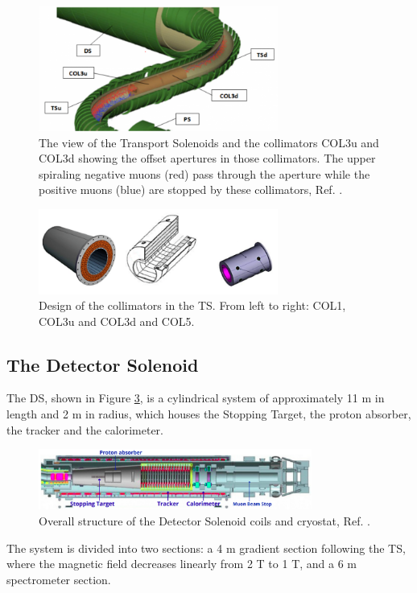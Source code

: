 \begin{figure}[!h]
    \centering
    \includegraphics[width =0.7\textwidth]{figures/png/800px-MuonBeamlineCollimators2.png}
    \caption{The view of the Transport Solenoids and the collimators COL3u and 
    COL3d showing the offset apertures in those collimators. The 
    upper spiraling negative muons (red) pass through the aperture while 
    the positive muons (blue) are stopped by these collimators, Ref. \cite{tsview}.}
    \label{fig:collimators}
    \end{figure}
    \begin{figure}[!h]
        \centering
        \includegraphics[width =0.7\textwidth]{figures/png/Screenshot_20240706_120535.png}
        \caption{Design of the collimators in the TS. From left to right: COL1, COL3u and COL3d
        and COL5.}
        \label{fig:collimatorsshape}
        \end{figure}

\subsection{The Detector Solenoid}
The DS, shown in Figure \ref{fig:DS}, is a cylindrical system of approximately 11 m in 
length and 2 m in radius, which houses the Stopping Target, 
the proton absorber, the tracker and the calorimeter. 
\begin{figure}[!h]
    \centering
    \includegraphics[width =0.8\textwidth]{figures/png/Screenshot_20240306_225639.png}
    \caption{Overall structure of the Detector Solenoid coils and cryostat, Ref. \cite{bobbb}.}
    \label{fig:DS}
    \end{figure}
The system is divided into two sections: a 4 m gradient section following the TS, 
where the magnetic field decreases linearly from 2 T to 1 T, and a 6 
m spectrometer section. 

